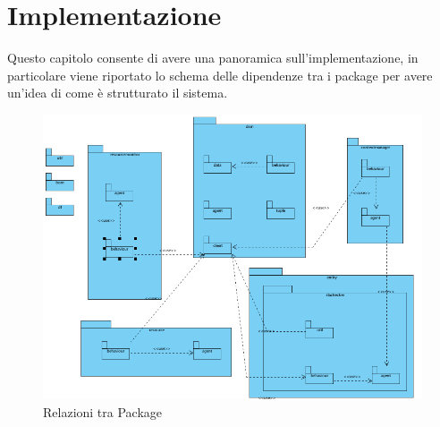 \chapter{Implementazione}
Questo capitolo consente di avere una panoramica sull'implementazione, in particolare viene riportato lo schema  delle dipendenze tra i package per avere un'idea di come è strutturato il sistema.
\begin{figure}[H]
\begin{center}
\includegraphics[scale=0.4]{etc/diagramm1.png}
\caption{Relazioni tra Package}
\label{fig:package}
\end{center}
\end{figure}